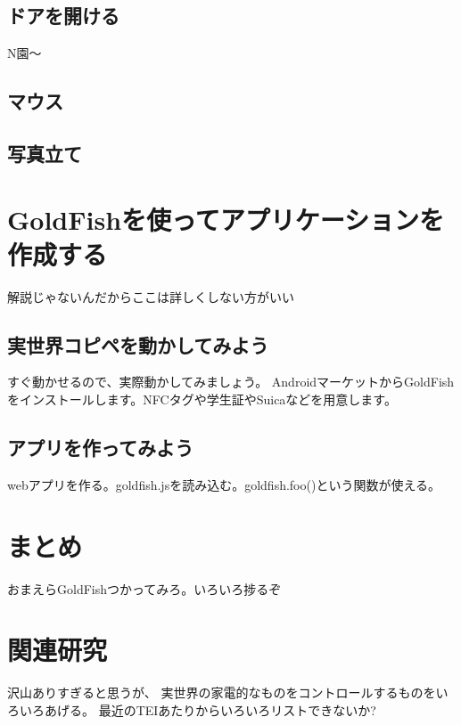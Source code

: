 \subsection{ドアを開ける}
N園〜

\subsection{マウス}

\subsection{写真立て}


\section{GoldFishを使ってアプリケーションを作成する}

解説じゃないんだからここは詳しくしない方がいい

\subsection{実世界コピペを動かしてみよう}
すぐ動かせるので、実際動かしてみましょう。
AndroidマーケットからGoldFishをインストールします。NFCタグや学生証やSuicaなどを用意します。

\subsection{アプリを作ってみよう}
webアプリを作る。goldfish.jsを読み込む。goldfish.foo()という関数が使える。

\section{まとめ}
おまえらGoldFishつかってみろ。いろいろ捗るぞ

\section{関連研究}

沢山ありすぎると思うが、
実世界の家電的なものをコントロールするものをいろいろあげる。
最近のTEIあたりからいろいろリストできないか?


